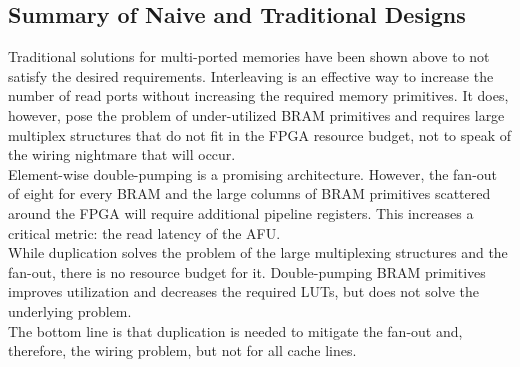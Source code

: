 \subsection{Summary of Naive and Traditional Designs}
Traditional solutions for multi-ported memories have been shown above to not satisfy the desired requirements. Interleaving is an effective way to increase the number of read ports without increasing the required memory primitives. It does, however, pose the problem of under-utilized BRAM primitives and requires large multiplex structures that do not fit in the FPGA resource budget, not to speak of the wiring nightmare that will occur.\\
Element-wise double-pumping is a promising architecture. However, the fan-out of eight for every BRAM and the large columns of BRAM primitives scattered around the FPGA will require additional pipeline registers. This increases a critical metric: the read latency of the AFU.\\
While duplication solves the problem of the large multiplexing structures and the fan-out, there is no resource budget for it. Double-pumping BRAM primitives improves utilization and decreases the required LUTs, but does not solve the underlying problem.\\
The bottom line is that duplication is needed to mitigate the fan-out and, therefore, the wiring problem, but not for all cache lines.




